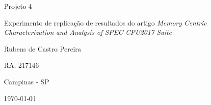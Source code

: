 \begin{titlepage}
\begin{center}
\vfill

{\fontsize{28}{\baselineskip}\selectfont
Projeto 4
}

\vfill

{\fontsize{36}{\baselineskip}\selectfont
Experimento de replicação de resultados do artigo \textit{Memory Centric Characterization and Analysis of SPEC CPU2017 Suite}
}

\vfill

{\fontsize{20}{\baselineskip}\selectfont
Rubens de Castro Pereira

RA: 217146
}


	
    
    
    
	
	
	

\vfill


{\fontsize{14}{\baselineskip}\selectfont
	Campinas - SP

	\today
}

\end{center}
\end{titlepage}